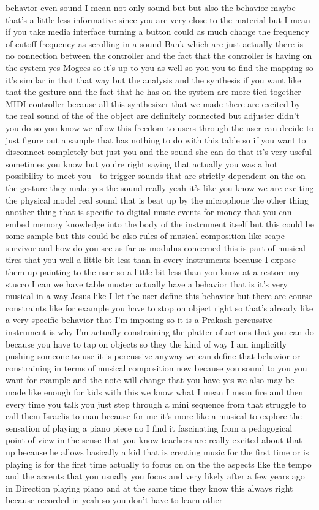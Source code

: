 behavior even sound I mean not only sound but but also the behavior maybe that's a little less informative since you are very close to the material but I mean if you take media interface turning a button could as much change the frequency of cutoff frequency as scrolling in a sound Bank which are just actually there is no connection between the controller and the fact that the controller is having on the system yes Mogees so it's up to you as well so you you to find the mapping so it's similar in that that way but the analysis and the synthesis if you want like that the gesture and the fact that he has on the system are more tied together MIDI controller because all this synthesizer that we made there are excited by the real sound of the of the object are definitely connected but adjuster didn't you do so you know we allow this freedom to users through the user can decide to just figure out a sample that has nothing to do with this table so if you want to disconnect completely but just you and the sound she can do that it's very useful sometimes you know but you're right saying that actually you was a hot possibility to meet you - to trigger sounds that are strictly dependent on the on the gesture they make yes the sound really yeah it's like you know we are exciting the physical model real sound that is beat up by the microphone the other thing another thing that is specific to digital music events for money that you can embed memory knowledge into the body of the instrument itself but this could be some sample but this could be also rules of musical composition like scape survivor and how do you see as far as modulus concerned this is part of musical tires that you well a little bit less than in every instruments because I expose them up painting to the user so a little bit less than you know at a restore my stucco I can we have table muster actually have a behavior that is it's very musical in a way Jesus like I let the user define this behavior but there are course constraints like for example you have to stop on object right so that's already like a very specific behavior that I'm imposing so it is a Prakash percussive instrument is why I'm actually constraining the platter of actions that you can do because you have to tap on objects so they the kind of way I am implicitly pushing someone to use it is percussive anyway we can define that behavior or constraining in terms of musical composition now because you sound to you you want for example and the note will change that you have yes we also may be made like enough for kids with this we know what I mean I mean fire and then every time you talk you just step through a mini sequence from that struggle to call them Israelis to man because for me it's more like a musical to explore the sensation of playing a piano piece no I find it fascinating from a pedagogical point of view in the sense that you know teachers are really excited about that up because he allows basically a kid that is creating music for the first time or is playing is for the first time actually to focus on on the the aspects like the tempo and the accents that you usually you focus and very likely after a few years ago in Direction playing piano and at the same time they know this always right because recorded in yeah so you don't have to learn other 